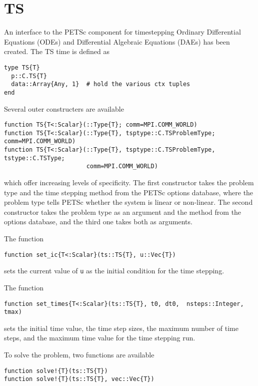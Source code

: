 \documentclass{article}
\begin{document}
\section{TS}
An interface to the PETSc component for timestepping Ordinary Differential
Equations (ODEs) and Differential Algebraic Equations (DAEs) has been created.
The TS time is defined as

\begin{verbatim}
type TS{T}
  p::C.TS{T}
  data::Array{Any, 1}  # hold the various ctx tuples
end
\end{verbatim}

Several outer constructers are available

\begin{verbatim}
function TS{T<:Scalar}(::Type{T}; comm=MPI.COMM_WORLD)
function TS{T<:Scalar}(::Type{T}, tsptype::C.TSProblemType; comm=MPI.COMM_WORLD)
function TS{T<:Scalar}(::Type{T}, tsptype::C.TSProblemType, tstype::C.TSType; 
                       comm=MPI.COMM_WORLD)
\end{verbatim}

\noindent which offer increasing levels of specificity.  The first constructor
takes the problem type and the time stepping method from the PETSc options 
database, where the problem type tells PETSc whether the system is linear or
non-linear. The second constructor takes the problem type as an argument and
the method from the options database, and the third one takes both as arguments.

The function
\begin{verbatim}
function set_ic{T<:Scalar}(ts::TS{T}, u::Vec{T}) 
\end{verbatim}

\noindent sets the current value of \texttt{u} as the initial condition for 
the time stepping.

The function
\begin{verbatim}
function set_times{T<:Scalar}(ts::TS{T}, t0, dt0,  nsteps::Integer, tmax)
\end{verbatim}

\noindent sets the initial time value, the time step sizes, the maximum number
of time steps, and the maximum time value for the time stepping run.

To solve the problem, two functions are available
\begin{verbatim}
function solve!{T}(ts::TS{T})
function solve!{T}(ts::TS{T}, vec::Vec{T})
\end{verbatim}
\end{document}
